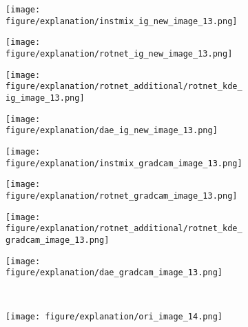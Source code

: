 \documentclass{article} \usepackage{iclr2021_conference,times}
\begin{document}
\begin{figure}[h!]
\begin{subfigure}{.11\textwidth}
\end{subfigure}
\hspace{-2mm}
\begin{subfigure}{.11\textwidth}
  \centering
  \texttt{[image: figure/explanation/instmix\_ig\_new\_image\_13.png]}
\end{subfigure}
\hspace{-2mm}
\begin{subfigure}{.11\textwidth}
  \centering
  \texttt{[image: figure/explanation/rotnet\_ig\_new\_image\_13.png]}
\end{subfigure}
\hspace{-2mm}
\begin{subfigure}{.11\textwidth}
  \centering
  \texttt{[image: figure/explanation/rotnet\_additional/rotnet\_kde\_ig\_image\_13.png]}
\end{subfigure}
\hspace{-2mm}
\begin{subfigure}{.11\textwidth}
  \centering
  \texttt{[image: figure/explanation/dae\_ig\_new\_image\_13.png]}
\end{subfigure}
\hspace{-2mm}
\begin{subfigure}{.11\textwidth}
  \centering
  \texttt{[image: figure/explanation/instmix\_gradcam\_image\_13.png]}
\end{subfigure}
\hspace{-2mm}
\begin{subfigure}{.11\textwidth}
  \centering
  \texttt{[image: figure/explanation/rotnet\_gradcam\_image\_13.png]}
\end{subfigure}
\hspace{-2mm}
\begin{subfigure}{.11\textwidth}
  \centering
  \texttt{[image: figure/explanation/rotnet\_additional/rotnet\_kde\_gradcam\_image\_13.png]}
\end{subfigure}
\hspace{-2mm}
\begin{subfigure}{.11\textwidth}
  \centering
  \texttt{[image: figure/explanation/dae\_gradcam\_image\_13.png]}
\end{subfigure}\\
\begin{subfigure}{.11\textwidth}
  \centering
  \texttt{[image: figure/explanation/ori\_image\_14.png]}
\end{subfigure}
\hspace{-2mm}

\end{figure}
\end{document}
